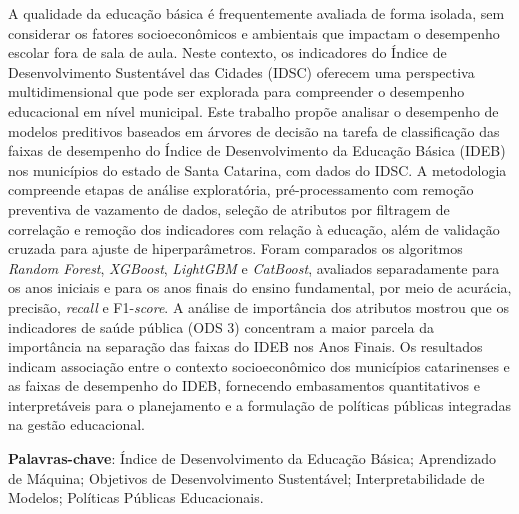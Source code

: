 
\setlength{\absparsep}{18pt} %
\begin{resumo}
	A qualidade da educação básica é frequentemente avaliada de forma isolada, sem considerar os fatores socioeconômicos e ambientais que impactam o desempenho escolar fora de sala de aula. Neste contexto, os indicadores do Índice de Desenvolvimento Sustentável das Cidades (IDSC) oferecem uma perspectiva multidimensional que pode ser explorada para compreender o desempenho educacional em nível municipal. Este trabalho propõe analisar o desempenho de modelos preditivos baseados em árvores de decisão na tarefa de classificação das faixas de desempenho do Índice de Desenvolvimento da Educação Básica (IDEB) nos municípios do estado de Santa Catarina, com dados do IDSC. A metodologia compreende etapas de análise exploratória, pré-processamento com remoção preventiva de vazamento de dados, seleção de atributos por filtragem de correlação e remoção dos indicadores com relação à educação, além de validação cruzada para ajuste de hiperparâmetros. Foram comparados os algoritmos \textit{Random Forest}, \textit{XGBoost}, \textit{LightGBM} e \textit{CatBoost}, avaliados separadamente para os anos iniciais e para os anos finais do ensino fundamental, por meio de acurácia, precisão, \textit{recall} e F1-\textit{score}. A análise de importância dos atributos mostrou que os indicadores de saúde pública (ODS 3) concentram a maior parcela da importância na separação das faixas do IDEB nos Anos Finais. Os resultados indicam associação entre o contexto socioeconômico dos municípios catarinenses e as faixas de desempenho do IDEB, fornecendo embasamentos quantitativos e interpretáveis para o planejamento e a formulação de políticas públicas integradas na gestão educacional.
	
	\textbf{Palavras-chave}: Índice de Desenvolvimento da Educação Básica; Aprendizado de Máquina; Objetivos de Desenvolvimento Sustentável; Interpretabilidade de Modelos; Políticas Públicas Educacionais.
\end{resumo}

